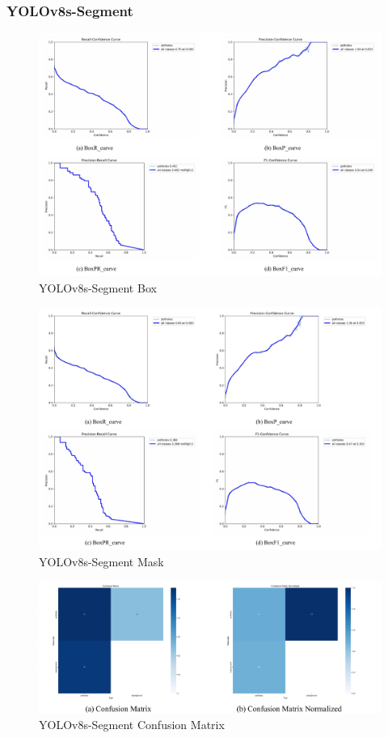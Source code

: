 \documentclass{MathorCupmodeling}
\begin{document}
	\subsubsection{YOLOv8s-Segment}
	\begin{figure}[H]
		\centering
		\includegraphics[scale=0.5]{Figures/segment/SegmentBox.pdf}
		\caption{YOLOv8s-Segment Box}
		\label{fig:YOLOv8s-Segment-Box}
	\end{figure}
	\begin{figure}[H]
		\centering
		\includegraphics[scale=0.5]{Figures/segment/SegmentMask.pdf}
		\caption{YOLOv8s-Segment Mask}
		\label{fig:YOLOv8s-Segment-Mask}
	\end{figure}
	\begin{figure}[H]
		\centering
		\includegraphics[scale=0.5]{Figures/segment/SegmentConfusionMatrix.pdf}
		\caption{YOLOv8s-Segment Confusion Matrix}
		\label{fig:YOLOv8s-Segment-ConfusionMatrix}
	\end{figure}
\end{document}
